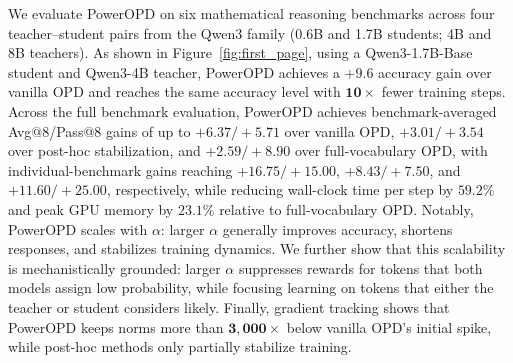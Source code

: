 We evaluate PowerOPD on six mathematical reasoning benchmarks across four teacher--student pairs from the Qwen3 family (0.6B and 1.7B students; 4B and 8B teachers).
As shown in Figure~\ref{fig:first_page}, using a Qwen3-1.7B-Base student and Qwen3-4B teacher, PowerOPD achieves a $\mathbf{+9.6}$ accuracy gain over vanilla OPD and reaches the same accuracy level with $\mathbf{10\times}$ fewer training steps.
Across the full benchmark evaluation, PowerOPD achieves benchmark-averaged Avg@8/Pass@8 gains of up to $\mathbf{+6.37/+5.71}$ over vanilla OPD, $\mathbf{+3.01/+3.54}$ over post-hoc stabilization, and $\mathbf{+2.59/+8.90}$ over full-vocabulary OPD, with individual-benchmark gains reaching $\mathbf{+16.75/+15.00}$, $\mathbf{+8.43/+7.50}$, and $\mathbf{+11.60/+25.00}$, respectively, while reducing wall-clock time per step by $59.2\%$ and peak GPU memory by $23.1\%$ relative to full-vocabulary OPD.
Notably, PowerOPD scales with $\alpha$: larger $\alpha$ generally improves accuracy, shortens responses, and stabilizes training dynamics.
We further show that this scalability is mechanistically grounded: larger $\alpha$ suppresses rewards for tokens that both models assign low probability, while focusing learning on tokens that either the teacher or student considers likely.
Finally, gradient tracking shows that PowerOPD keeps norms more than $\mathbf{3{,}000\times}$ below vanilla OPD's initial spike, while post-hoc methods only partially stabilize training.

